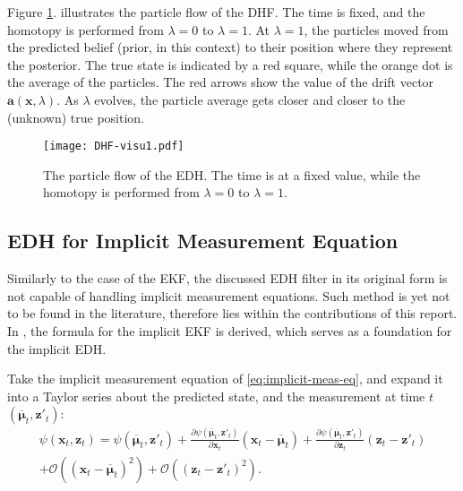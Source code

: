 Figure \ref{fig:dhf-ill}. illustrates the particle flow of the DHF. The time is fixed, and the homotopy is performed from $\lambda = 0$ to $\lambda = 1$. At $\lambda = 1$, the particles moved from the predicted belief (prior, in this context) to their position where they represent the posterior. The true state is indicated by a red square, while the orange dot is the average of the particles. The red arrows show the value of the drift vector $\mathbf{a}(\mathbf{x},\lambda)$. As $\lambda$ evolves, the particle average gets closer and closer to the (unknown) true position.

\begin{figure}
    \centering
    \texttt{[image: DHF-visu1.pdf]}
    \caption{The particle flow of the EDH. The time is at a fixed value, while the homotopy is performed from $\lambda = 0$ to $\lambda = 1$.}
    \label{fig:dhf-ill}
\end{figure}

\subsection{EDH for Implicit Measurement Equation}

Similarly to the case of the EKF, the discussed EDH filter in its original form is not capable of
handling implicit measurement equations.
Such method is yet not to be found in the literature, therefore lies within the contributions
of this report. In \cite{Zhang2012}, the formula for the implicit EKF is derived,
which serves as a foundation for the implicit EDH.

Take the implicit measurement equation of \eqref{eq:implicit-meas-eq},
and expand it into a Taylor series about the predicted state, and the measurement at time $t$ $\left(\overline{\boldsymbol\mu}_t,\mathbf{z}'_t\right)$:
\begin{align}
    \psi(\mathbf{x}_t,\mathbf{z}_t) = \psi(\overline{\boldsymbol\mu}_t,\mathbf{z}'_t)
    + \frac{\partial \psi(\overline{\boldsymbol\mu}_t,\mathbf{z}'_t)}{\partial \mathbf{x}_t}(\mathbf{x}_t-\overline{\boldsymbol\mu}_t)
    + \frac{\partial \psi(\overline{\boldsymbol\mu}_t,\mathbf{z}'_t)}{\partial \mathbf{z}_t}(\mathbf{z}_t-\mathbf{z}'_t) \\
    + \mathcal{O}((\mathbf{x}_t-\overline{\boldsymbol\mu}_t)^2)
    + \mathcal{O}((\mathbf{z}_t-\mathbf{z}'_t)^2) \nonumber.
\end{align}

